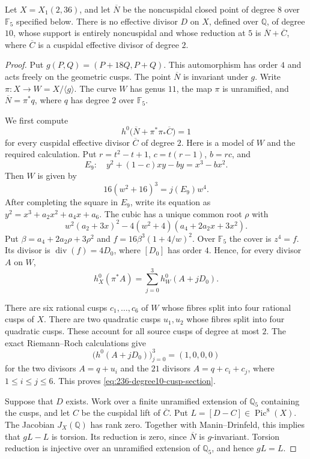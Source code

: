 \begin{lemma}\label{lem:236-degree10-oldN8}
Let $X=X_1(2,36)$, and let $\overline N$ be the noncuspidal
closed point of degree $8$ over $\mathbb F_5$ specified below.
There is no effective divisor $D$ on $X$, defined over $\mathbb Q$,
of degree $10$, whose support is entirely noncuspidal and whose
reduction at $5$ is $\overline N+\overline C$, where
$\overline C$ is a cuspidal effective divisor of degree $2$.
\end{lemma}
\begin{proof}
Put $g(P,Q)=(P+18Q,P+Q)$.
This automorphism has order $4$ and acts freely on the geometric
cusps. The point $\overline N$ is invariant under $g$.
Write $\pi:X\longrightarrow W=X/\langle g\rangle$.
The curve $W$ has genus $11$, the map $\pi$ is unramified, and
$\overline N=\pi^*q$, where $q$ has degree $2$ over $\mathbb F_5$.

We first compute
\begin{equation}\label{eq:236-degree10-cusp-section}
 h^0\bigl(\overline N+\pi^*\pi_*\overline C\bigr)=1
\end{equation}
for every cuspidal effective divisor $\overline C$ of degree $2$.
Here is a model of $W$ and the required calculation.
Put $r=t^2-t+1$, $c=t(r-1)$, $b=rc$, and
\[
 E_9:\quad y^2+(1-c)xy-by=x^3-bx^2.
\]
Then $W$ is given by
\[
 16(w^2+16)^3=j(E_9)w^4.
\]
After completing the square in $E_9$, write its equation as
$y^2=x^3+a_2x^2+a_4x+a_6$.
The cubic has a unique common root $\rho$ with
\[
 w^2(a_2+3x)^2-4(w^2+4)(a_4+2a_2x+3x^2).
\]
Put $\beta=a_4+2a_2\rho+3\rho^2$ and
$f=16\beta^3(1+4/w)^2$.
Over $\mathbb F_5$ the cover is $z^4=f$.
Its divisor is $\operatorname{div}(f)=4D_0$, where $[D_0]$ has
order $4$. Hence, for every divisor $A$ on $W$,
\[
 h^0_X(\pi^*A)=\sum_{j=0}^3h^0_W(A+jD_0).
\]

There are six rational cusps $c_1,\ldots,c_6$ of $W$ whose
fibres split into four rational cusps of $X$.
There are two quadratic cusps $u_1,u_2$ whose fibres split into
four quadratic cusps. These account for all source cusps of
degree at most $2$.
The exact Riemann--Roch calculations give
\[
 \bigl(h^0(A+jD_0)\bigr)_{j=0}^3=(1,0,0,0)
\]
for the two divisors $A=q+u_i$ and the $21$ divisors
$A=q+c_i+c_j$, where $1\leq i\leq j\leq6$.
This proves \eqref{eq:236-degree10-cusp-section}.

Suppose that $D$ exists. Work over a finite unramified extension
of $\mathbb Q_5$ containing the cusps, and let $C$ be the cuspidal
lift of $\overline C$. Put $L=[D-C]\in\operatorname{Pic}^8(X)$.
The Jacobian $J_X(\mathbb Q)$ has rank zero. Together with
Manin--Drinfeld, this implies that $gL-L$ is torsion.
Its reduction is zero, since $\overline N$ is $g$-invariant.
Torsion reduction is injective over an unramified extension of
$\mathbb Q_5$, and hence $gL=L$.


\end{proof}
